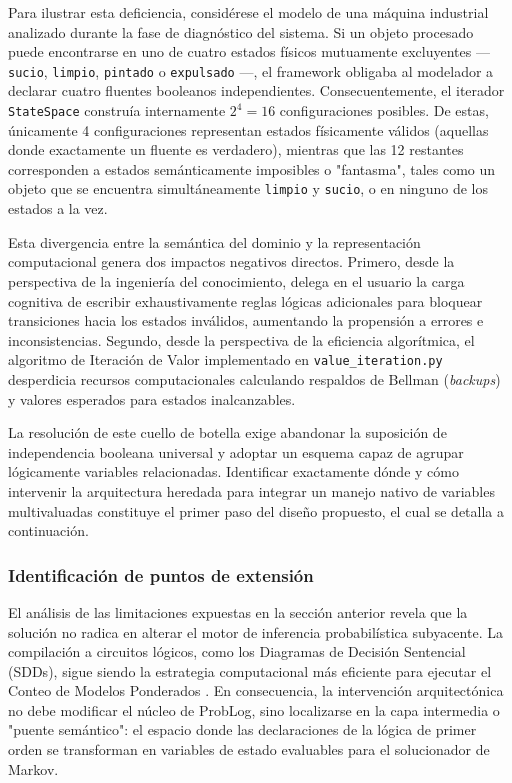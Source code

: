 Para ilustrar esta deficiencia, considérese el modelo de una máquina industrial analizado durante la fase de diagnóstico del sistema. Si un objeto procesado puede encontrarse en uno de cuatro estados físicos mutuamente excluyentes --- \texttt{sucio}, \texttt{limpio}, \texttt{pintado} o \texttt{expulsado} ---, el framework obligaba al modelador a declarar cuatro fluentes booleanos independientes. Consecuentemente, el iterador \texttt{StateSpace} construía internamente $2^4 = 16$ configuraciones posibles. De estas, únicamente 4 configuraciones representan estados físicamente válidos (aquellas donde exactamente un fluente es verdadero), mientras que las 12 restantes corresponden a estados semánticamente imposibles o "fantasma", tales como un objeto que se encuentra simultáneamente \texttt{limpio} y \texttt{sucio}, o en ninguno de los estados a la vez.

Esta divergencia entre la semántica del dominio y la representación computacional genera dos impactos negativos directos. Primero, desde la perspectiva de la ingeniería del conocimiento, delega en el usuario la carga cognitiva de escribir exhaustivamente reglas lógicas adicionales para bloquear transiciones hacia los estados inválidos, aumentando la propensión a errores e inconsistencias. Segundo, desde la perspectiva de la eficiencia algorítmica, el algoritmo de Iteración de Valor implementado en \texttt{value\_iteration.py} desperdicia recursos computacionales calculando respaldos de Bellman (\textit{backups}) y valores esperados para estados inalcanzables.

La resolución de este cuello de botella exige abandonar la suposición de independencia booleana universal y adoptar un esquema capaz de agrupar lógicamente variables relacionadas. Identificar exactamente dónde y cómo intervenir la arquitectura heredada para integrar un manejo nativo de variables multivaluadas constituye el primer paso del diseño propuesto, el cual se detalla a continuación.


\subsubsection{Identificación de puntos de extensión}
\label{sec:di-puntos-extension}

El análisis de las limitaciones expuestas en la sección anterior revela que la solución no radica en alterar el motor de inferencia probabilística subyacente. La compilación a circuitos lógicos, como los Diagramas de Decisión Sentencial (SDDs), sigue siendo la estrategia computacional más eficiente para ejecutar el Conteo de Modelos Ponderados \cite{vlasselaer2016problog2}. En consecuencia, la intervención arquitectónica no debe modificar el núcleo de ProbLog, sino localizarse en la capa intermedia o "puente semántico": el espacio donde las declaraciones de la lógica de primer orden se transforman en variables de estado evaluables para el solucionador de Markov.

